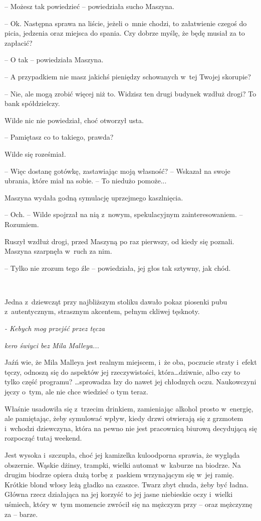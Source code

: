 \documentclass[oneside,polish,11pt,sfheadings]{mwbk}
\begin{document}
-- Możesz tak powiedzieć -- powiedziała sucho Maszyna.

-- Ok. Następna sprawa na liście, jeżeli o~mnie chodzi, to załatwienie
czegoś do picia, jedzenia oraz miejsca do spania. Czy dobrze myślę, że
będę musiał za to zapłacić?

-- O tak -- powiedziała Maszyna.

-- A przypadkiem nie masz jakichś pieniędzy schowanych w~tej Twojej
skorupie?

-- Nie, ale mogą zrobić więcej niż to. Widzisz ten drugi budynek wzdłuż
drogi? To bank spółdzielczy.

Wilde nic nie powiedział, choć otworzył usta.

-- Pamiętasz co to takiego, prawda?

Wilde się roześmiał. 

-- Więc dostanę gotówkę, zastawiając moją własność?
-- Wskazał na swoje ubrania, które miał na sobie. -- To niedużo pomoże...

Maszyna wydała godną symulację uprzejmego kaszlnięcia.

-- Och. -- Wilde spojrzał na nią z~nowym, spekulacyjnym zainteresowaniem.
-- Rozumiem.

Ruszył wzdłuż drogi, przed Maszyną po raz pierwszy, od kiedy się
poznali. Maszyna szarpnęła w~ruch za nim.

-- Tylko nie zrozum tego źle -- powiedziała, jej głos tak sztywny, jak
chód.

~

Jedna z~dziewcząt przy najbliższym stoliku dawało pokaz piosenki pubu z~autentycznym, strasznym akcentem, pełnym ckliwej tęsknoty.

\emph{- Kebych mog przejść przez tęcza}

\emph{kero świyci bez Mila Malleya...}

Jaźń wie, że Mila Malleya jest realnym miejscem, i~że oba, poczucie
straty i~efekt tęczy, odnoszą się do aspektów jej rzeczywistości,
która\ldots dziwnie, albo czy to tylko część programu? \ldots sprowadza łzy do
nawet jej chłodnych oczu. Naukowczyni jęczy o~tym, ale nie chce wiedzieć
o tym teraz.

Właśnie usadowiła się z~trzecim drinkiem, zamieniając alkohol prosto w~energię, ale pamiętając, żeby symulować wpływ, kiedy drzwi otwierają się
z grzmotem i~wchodzi dziewczyna, która na pewno nie jest pracownicą
biurową decydującą się rozpocząć tutaj weekend.

Jest wysoka i~szczupła, choć jej kamizelka kuloodporna sprawia, że
wygląda obszernie. Wąskie dżinsy, trampki, wielki automat w~kaburze na
biodrze. Na drugim biodrze opiera dużą torbę z~paskiem wrzynającym się w~jej ramię. Krótkie blond włosy leżą gładko na czaszce. Twarz zbyt chuda,
żeby być ładna. Główna rzecz działająca na jej korzyść to jej jasne
niebieskie oczy i~wielki uśmiech, który w~tym momencie zwrócił się na
mężczyzn przy -- oraz mężczyznę za -- barze.
\end{document}
